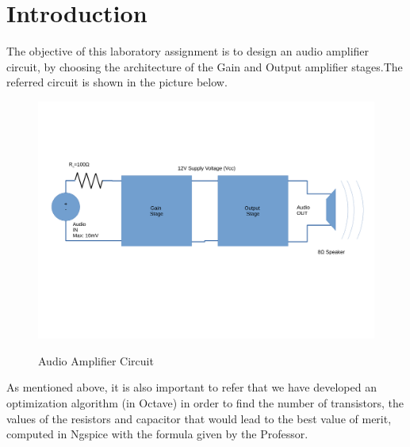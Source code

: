 \newpage
\section{Introduction}
\label{sec:introduction}

The objective of this laboratory assignment is to design an audio amplifier circuit, by choosing the architecture of the Gain and Output amplifier stages.The referred circuit is shown in the picture below. 

\bigskip 

\begin{figure}[!ht] \centering
\caption{Audio Amplifier Circuit}
\includegraphics[width=1\textwidth, scale=1.0]{DesenhoT4.pdf}  
\label{fig:circuit}
\end{figure}

As mentioned above, it is also important to refer that we have developed an optimization algorithm (in Octave) in order to find the number of transistors, the values of the resistors and capacitor that would lead to the best value of merit, computed in Ngspice with the formula given by the Professor.   

